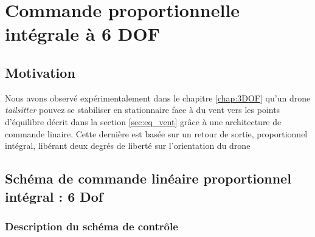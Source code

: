 \chapter{Commande proportionnelle intégrale à 6 DOF}
\minitoc
\label{chap:6DOF}

\section{Motivation}
\label{sec:motivation6DOF}
Nous avons observé expérimentalement dans le chapitre \ref{chap:3DOF} qu'un drone \textit{tailsitter} pouvez se stabiliser en stationnaire face à du vent vers les points d'équilibre décrit dans la section \ref{sec:eq_vent} grâce à une architecture de commande linaire. Cette dernière est basée sur un retour de sortie, proportionnel intégral, libérant deux degrés de liberté sur l'orientation du drone 


\section{Schéma de commande linéaire proportionnel intégral : 6 Dof}
\label{sec:6dofcmd}
\subsection{Description du schéma de contrôle}
\label{sec:ctl_sche}

